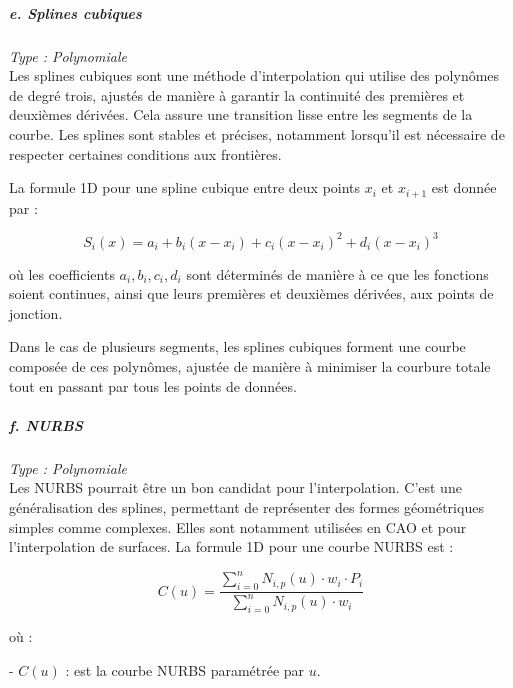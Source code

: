 \subparagraph{e. Splines cubiques \cite{gordont1971}}
\textit{Type : Polynomiale} \\
\phantom{----}Les splines cubiques sont une méthode d'interpolation qui utilise des polynômes de degré trois, ajustés de manière à garantir la continuité des premières et deuxièmes dérivées. Cela assure une transition lisse entre les segments de la courbe. Les splines sont stables et précises, notamment lorsqu'il est nécessaire de respecter certaines conditions aux frontières.

La formule 1D pour une spline cubique entre deux points \( x_i \) et \( x_{i+1} \) est donnée par :

\vspace{-0,5 cm}

\begin{equation}
    S_i(x) = a_i + b_i(x - x_i) + c_i(x - x_i)^2 + d_i(x - x_i)^3
\end{equation}

où les coefficients \( a_i, b_i, c_i, d_i \) sont déterminés de manière à ce que les fonctions soient continues, ainsi que leurs premières et deuxièmes dérivées, aux points de jonction.

Dans le cas de plusieurs segments, les splines cubiques forment une courbe composée de ces polynômes, ajustée de manière à minimiser la courbure totale tout en passant par tous les points de données.


\subparagraph{f. NURBS \cite{surface, piegl1995nurbs}}
\textit{Type : Polynomiale} \\
\phantom{----}Les \ac{NURBS} pourrait être un bon candidat pour l'interpolation. C'est une généralisation des splines, permettant de représenter des formes géométriques simples comme complexes. Elles sont notamment utilisées en CAO et pour l'interpolation de surfaces.
La formule 1D pour une courbe NURBS est :

\vspace{-0,6 cm}

\begin{equation}
    C(u) = \frac{\sum_{i=0}^{n} N_{i,p}(u) \cdot w_i \cdot P_i}{\sum_{i=0}^{n} N_{i,p}(u) \cdot w_i}
\end{equation}

\vspace{-0,4 cm}

où :

- \( C(u) \) : est la courbe NURBS paramétrée par \( u \).

\vspace{-0,2 cm}


